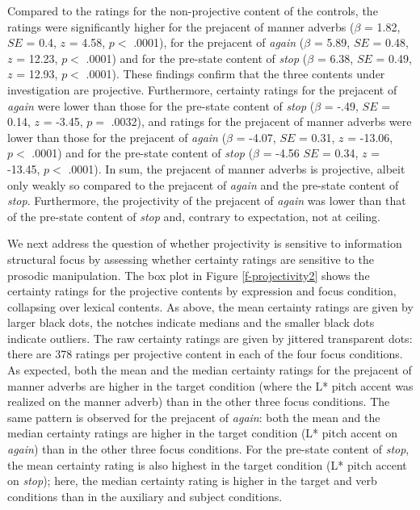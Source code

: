 \documentclass[a4paper,12pt]{article}
\newcommand{\6}{\mbox{$[\hspace*{-.6mm}[$}}
\newcommand{\9}{\mbox{$]\hspace*{-.6mm}]$}}
\begin{document}
Compared to the ratings for the non-projective content of the controls, the ratings were significantly higher for the prejacent of manner adverbs ($\beta$ = 1.82, $SE$ = 0.4, $z$ = 4.58, $p <$ .0001), for the prejacent of {\em again} ($\beta$ = 5.89, $SE$ = 0.48, $z$ = 12.23, $p <$ .0001) and for the pre-state content of {\em stop} ($\beta$ = 6.38, $SE$ = 0.49, $z$ = 12.93, $p <$ .0001). These findings confirm that the three contents under investigation are projective. Furthermore, certainty ratings for the prejacent of {\em again} were lower than those for the pre-state content of {\em stop} ($\beta$ = -.49, $SE$ = 0.14, $z$ = -3.45, $p =$ .0032), and ratings for the prejacent of manner adverbs were lower than those for the prejacent of {\em again} ($\beta$ = -4.07, $SE$ = 0.31, $z$ = -13.06, $p <$ .0001) and for the pre-state content of {\em stop} ($\beta$ = -4.56 $SE$ = 0.34, $z$ = -13.45, $p <$ .0001). In sum, the prejacent of manner adverbs is projective, albeit only weakly so compared to the prejacent of {\em again} and the pre-state content of {\em stop}. Furthermore, the projectivity of the prejacent of {\em again} was lower than that of the pre-state content of {\em stop} and, contrary to expectation, not at ceiling. 

We next address the question of whether projectivity is sensitive to information structural focus by assessing whether certainty ratings are sensitive to the prosodic manipulation. The box plot in Figure \ref{f-projectivity2} shows the certainty ratings for the projective contents by expression and focus condition, collapsing over lexical contents. As above, the mean certainty ratings are given by larger black dots, the notches indicate medians and the smaller black dots indicate outliers. The raw certainty ratings are given by jittered transparent dots: there are 378 ratings per projective content in each of the four focus conditions. As expected, both the mean and the median certainty ratings for the prejacent of manner adverbs are higher in the target condition (where the L* pitch accent was realized on the manner adverb) than in the other three focus conditions. The same pattern is observed for the prejacent of {\em again}: both the mean and the median certainty ratings are higher in the target condition (L* pitch accent on {\em again}) than in the other three focus conditions. For the pre-state content of {\em stop}, the mean certainty rating is also highest in the target condition (L* pitch accent on {\em stop}); here, the median certainty rating is higher in the target and verb conditions than in the auxiliary and subject conditions. 
\end{document}
